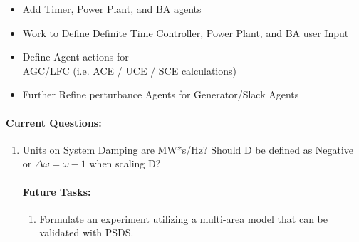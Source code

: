 \documentclass[12pt]{article}
\begin{document}
\begin{multicols}{2}
\begin{enumerate}
\begin{itemize}
		\item Add Timer, Power Plant, and BA agents
		\item Work to Define Definite Time Controller, Power Plant, and BA user Input
		
		\item Define Agent actions for \\ AGC/LFC (i.e. ACE / UCE / SCE calculations)
		\item Further Refine perturbance Agents for Generator/Slack Agents
		\end{itemize}
		

	\end{enumerate}
\vfill\null
\columnbreak
	\paragraph{Current Questions:}
	\begin{enumerate}

	\item Units on System Damping are MW*s/Hz? Should D be defined as Negative or $\Delta\omega = \omega-1$ when scaling D?
	
		






\paragraph{Future Tasks:} %
	\begin{enumerate}
		\item Formulate an experiment utilizing a multi-area model that can be validated with PSDS.
		


\end{enumerate}
\end{enumerate}
\end{multicols}
\end{document}
